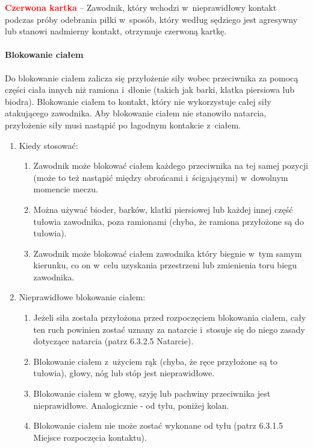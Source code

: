 \documentclass[12pt,a4paper]{article}
\newcommand\redcard[1]{\bgroup\textcolor{red}{\textbf{#1}}}
\begin{document}
\redcard{Czerwona kartka} -- Zawodnik, który wchodzi w~nieprawidłowy kontakt
podczas próby odebrania piłki w~sposób, który według sędziego jest
agresywny lub stanowi nadmierny kontakt, otrzymuje czerwoną kartkę.

\paragraph{Blokowanie ciałem}
Do blokowanie ciałem zalicza się
przyłożenie siły wobec przeciwnika za pomocą części ciała innych niż
ramiona i~dłonie (takich jak barki, klatka piersiowa lub biodra).
Blokowanie ciałem to kontakt, który nie wykorzystuje całej siły
atakującego zawodnika. Aby blokowanie ciałem nie stanowiło natarcia,
przyłożenie siły musi nastąpić po łagodnym kontakcie z~ciałem.

\begin{enumerate}
	\item
	      Kiedy stosować:

	      \begin{enumerate}
		      \item
		            Zawodnik może blokować ciałem każdego przeciwnika na tej samej
		            pozycji (może to też nastąpić między obrońcami i~ścigającymi) w~dowolnym momencie meczu.
		      \item
		            Można używać bioder, barków, klatki piersiowej lub każdej innej
		            część tułowia zawodnika, poza ramionami (chyba, że ramiona
		            przyłożone są do tułowia).
		      \item
		            Zawodnik może blokować ciałem zawodnika który biegnie w~tym samym
		            kierunku, co on w~celu uzyskania przestrzeni lub zmienienia toru
		            biegu zawodnika.
	      \end{enumerate}
	\item
	      Nieprawidłowe blokowanie ciałem:

	      \begin{enumerate}
		      \item
		            Jeżeli siła została przyłożona przed rozpoczęciem blokowania ciałem,
		            cały ten ruch powinien zostać uznany za natarcie i~stosuje się do
		            niego zasady dotyczące natarcia (patrz 6.3.2.5 Natarcie).
		      \item
		            Blokowanie ciałem z~użyciem rąk (chyba, że ręce przyłożone są to
		            tułowia), głowy, nóg lub stóp jest nieprawidłowe.
		      \item
		            Blokowanie ciałem w głowę, szyję lub pachwiny przeciwnika jest
		            nieprawidłowe. Analogicznie - od tyłu, poniżej kolan.
		      \item
		            Blokowanie ciałem nie może zostać wykonane od tyłu (patrz 6.3.1.5
		            Miejsce rozpoczęcia kontaktu).
	      \end{enumerate}
\end{enumerate}
\end{document}
